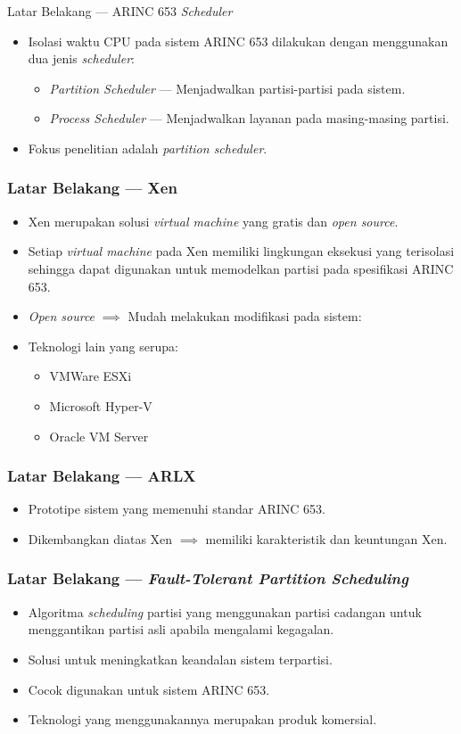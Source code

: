 \documentclass[xetex]{beamer}
\begin{document}
\begin{frame}{Latar Belakang --- ARINC 653 \textit{Scheduler}}
	\begin{itemize}
		\item Isolasi waktu CPU pada sistem ARINC 653 dilakukan dengan menggunakan dua jenis \textit{scheduler}:
			\begin{itemize}
				\item \textit{Partition Scheduler} --- Menjadwalkan partisi-partisi pada sistem.
				\item \textit{Process Scheduler} --- Menjadwalkan layanan pada masing-masing partisi.
			\end{itemize}
		\item Fokus penelitian adalah \textit{partition scheduler}.
	\end{itemize}
\end{frame}
\begin{frame}
	\frametitle{Latar Belakang --- Xen}
	\begin{itemize}
		\item Xen merupakan solusi \textit{virtual machine} yang gratis dan \textit{open source}.
		\item Setiap \textit{virtual machine} pada Xen memiliki lingkungan eksekusi yang
			terisolasi sehingga dapat digunakan untuk memodelkan partisi pada
			spesifikasi ARINC 653. 
		\item \textit{Open source} $\implies$ Mudah melakukan modifikasi pada sistem:
		\item Teknologi lain yang serupa:
			\begin{itemize}
				\item VMWare ESXi
				\item Microsoft Hyper-V
				\item Oracle VM Server
			\end{itemize}
	\end{itemize}
\end{frame}
\begin{frame}
	\frametitle{Latar Belakang --- ARLX}
	\begin{itemize}
		\item Prototipe sistem yang memenuhi standar ARINC 653.
		\item Dikembangkan diatas Xen  $\implies$ memiliki karakteristik dan keuntungan Xen.
	\end{itemize}
\end{frame}
\begin{frame}
	\frametitle{Latar Belakang --- \textit{Fault-Tolerant Partition Scheduling}}
	\begin{itemize}
		\item Algoritma \textit{scheduling} partisi yang menggunakan partisi cadangan untuk menggantikan partisi asli apabila mengalami kegagalan.
		\item Solusi untuk meningkatkan keandalan sistem terpartisi.
		\item Cocok digunakan untuk sistem ARINC 653.
		\item Teknologi yang menggunakannya merupakan produk komersial.
	\end{itemize}
\end{frame}
\end{document}
